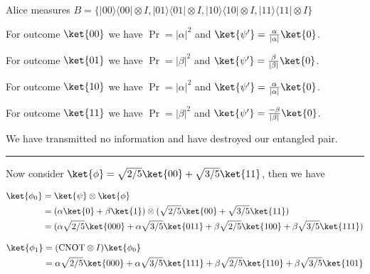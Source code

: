 \documentclass{article}
\newcommand{\ketbra}[2]{|#1\rangle\!\langle #2|}
\newcommand{\abs}[1]{\left\lvert #1 \right\rvert}
\newcommand{\CNOT}{{\rm CNOT}}
\begin{document}
\begin{enumerate}
        Alice measures $B=\{\ketbra{00}{00}\otimes I,\ketbra{01}{01}\otimes I,\ketbra{10}{10}\otimes I,\ketbra{11}{11}\otimes I\}$


        For outcome $\ket{00}$ we have $\Pr=\abs{\alpha}^2$ and $\ket{\psi'}=\frac{\alpha}{\abs{\alpha}}\ket{0}$.

        For outcome $\ket{01}$ we have $\Pr=\abs{\beta}^2$ and $\ket{\psi'}=\frac{\beta}{\abs{\beta}}\ket{0}$.

        For outcome $\ket{10}$ we have $\Pr=\abs{\alpha}^2$ and $\ket{\psi'}=\frac{\alpha}{\abs{\alpha}}\ket{0}$.

        For outcome $\ket{11}$ we have $\Pr=\abs{\beta}^2$ and $\ket{\psi'}=\frac{-\beta}{\abs{\beta}}\ket{0}$.


        We have transmitted no information and have destroyed our entangled pair.

        \vspace{0.5cm}\hrule\vspace{0.5cm}

        Now consider $\ket{\phi}=\sqrt{2/5}\ket{00}+\sqrt{3/5}\ket{11}$, then we have

        $$\begin{aligned}
            \ket{\phi_0} & =\ket{\psi}\otimes\ket{\phi}                                                                             \\
                         & =(\alpha\ket{0}+\beta\ket{1})\otimes(\sqrt{2/5}\ket{00}+\sqrt{3/5}\ket{11})                              \\
                         & =(\alpha\sqrt{2/5}\ket{000}+\alpha\sqrt{3/5}\ket{011}+\beta\sqrt{2/5}\ket{100}+\beta\sqrt{3/5}\ket{111}) \\
          \end{aligned}$$

        $$\begin{aligned}
            \ket{\phi_1} & =(\CNOT\otimes I)\ket{\phi_0}                                                                          \\
                         & =\alpha\sqrt{2/5}\ket{000}+\alpha\sqrt{3/5}\ket{111}+\beta\sqrt{2/5}\ket{110}+\beta\sqrt{3/5}\ket{101} \\
          \end{aligned}$$


\end{enumerate}
\end{document}
